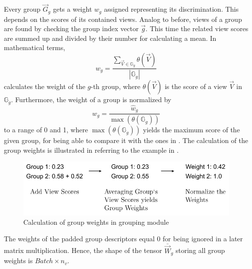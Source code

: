 Every group $\vec{G}_g$ gets a weight $w_g$ assigned representing its discrimination.
This depends on the scores of its contained views.
Analog to before, views of a group are found by checking the group index vector $\vec{g}$.
This time the related view scores are summed up and divided by their number for calculating a mean.
In mathematical terms,
\begin{equation}
	{w}_g = \frac{\sum_{\vec{V} \in \mathbb{G}_g} \theta(\vec{V})}{|\mathbb{G}_g|}
\end{equation}
calculates the weight of the $g$-th group, where $\theta(\vec{V})$ is the score of a view $\vec{V}$ in $\mathbb{G}_g$.
Furthermore, the weight of a group is normalized by
\begin{equation}
	w_g = \frac{\hat{w}_g}{\max(\theta(\mathbb{G}_g))}
\end{equation}
to a range of 0 and 1, where $\max(\theta(\mathbb{G}_g))$ yields the maximum score of the given group, for being able to compare it with the ones in \cite{Feng2018}.
The calculation of the group weights is illustrated in  referring to the example in .
\begin{figure}
	\centering
	\includegraphics[]{images/grouping_module_weights.pdf}
	\caption{Calculation of group weights in grouping module}
	\label{fig:grouping-module-weights}
\end{figure}
The weights of the padded group descriptors equal 0 for being ignored in a later matrix multiplication.
Hence, the shape of the tensor $\bar{\vec{W}}_g$ storing all group weights is $Batch \times n_v$.